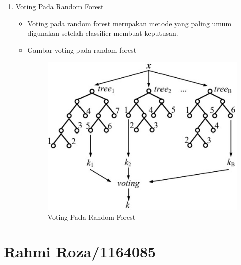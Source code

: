 \begin{enumerate}
\item Voting Pada Random Forest
	\begin{itemize}
		\item Voting pada random forest merupakan metode yang paling umum digunakan setelah classifier membuat keputusan.
		\item Gambar voting pada random forest
			\begin{figure}[ht]
			\centering
			\includegraphics[scale=0.5]{figures/j3.jpg}
			\caption{Voting Pada Random Forest}
			\label{contoh}
			\end{figure}
	\end{itemize}

\end{enumerate}


\section{Rahmi Roza/1164085}
